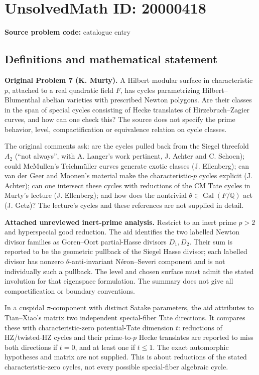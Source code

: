 \documentclass[11pt]{article}
\newcommand{\Q}{\mathbb{Q}}
\begin{document}
\section*{UnsolvedMath ID: 20000418}
\textbf{Source problem code:} catalogue entry
\subsection{Definitions and mathematical statement}
\textbf{Original Problem 7 (K. Murty).} A Hilbert modular surface in characteristic $p$, attached to a real quadratic field $F$, has cycles parametrizing Hilbert--Blumenthal abelian varieties with prescribed Newton polygons. Are their classes in the span of special cycles consisting of Hecke translates of Hirzebruch--Zagier curves, and how can one check this? The source does not specify the prime behavior, level, compactification or equivalence relation on cycle classes.

The original comments ask: are the cycles pulled back from the Siegel threefold $A_2$ (``not always'', with A. Langer's work pertinent, J. Achter and C. Schoen); could McMullen's Teichmüller curves generate exotic classes (J. Ellenberg); can van der Geer and Moonen's material make the characteristic-$p$ cycles explicit (J. Achter); can one intersect these cycles with reductions of the CM Tate cycles in Murty's lecture (J. Ellenberg); and how does the nontrivial $\theta\in\operatorname{Gal}(F/\Q)$ act (J. Getz)? The lecture's cycles and these references are not supplied in detail.

\textbf{Attached unreviewed inert-prime analysis.} Restrict to an inert prime $p>2$ and hyperspecial good reduction. The aid identifies the two labelled Newton divisor families as Goren--Oort partial-Hasse divisors $D_1,D_2$. Their sum is reported to be the geometric pullback of the Siegel Hasse divisor; each labelled divisor has nonzero $\theta$-anti-invariant Néron--Severi component and is not individually such a pullback. The level and chosen surface must admit the stated involution for that eigenspace formulation. The summary does not give all compactification or boundary conventions.

In a cuspidal $\pi$-component with distinct Satake parameters, the aid attributes to Tian--Xiao's matrix two independent special-fiber Tate directions. It compares these with characteristic-zero potential-Tate dimension $t$: reductions of HZ/twisted-HZ cycles and their prime-to-$p$ Hecke translates are reported to miss both directions if $t=0$, and at least one if $t\le1$. The exact automorphic hypotheses and matrix are not supplied. This is about reductions of the stated characteristic-zero cycles, not every possible special-fiber algebraic cycle.
\end{document}
